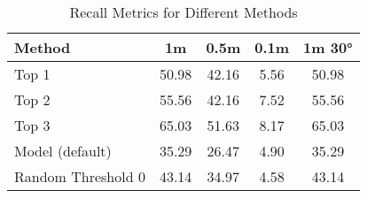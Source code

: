 
\begin{table}[ht]
    \centering
    \begin{tabular}{lcccc}
        \hline
        \textbf{Method} & \textbf{1m} & \textbf{0.5m} & \textbf{0.1m} & \textbf{1m 30°} \\
        \hline
    
        Top 1 & 50.98 & 42.16 & 5.56 & 50.98 \\
        Top 2 & 55.56 & 42.16 & 7.52 & 55.56 \\
        Top 3 & 65.03 & 51.63 & 8.17 & 65.03 \\
        Model (default) & 35.29 & 26.47 & 4.90 & 35.29 \\
        Random Threshold 0 & 43.14 & 34.97 & 4.58 & 43.14 \\
        \hline
    \end{tabular}
    \caption{Recall Metrics for Different Methods}
    \label{tab:recall_metrics}
\end{table}
